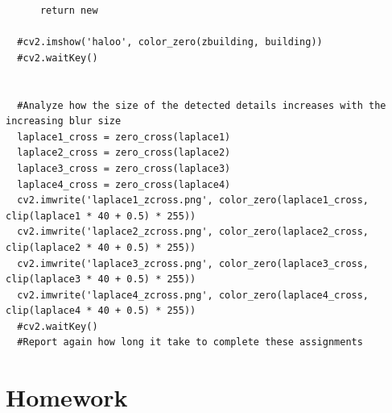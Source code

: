 \documentclass{article}
\begin{document}
\begin{verbatim}
      return new

  #cv2.imshow('haloo', color_zero(zbuilding, building))
  #cv2.waitKey()
      

  #Analyze how the size of the detected details increases with the increasing blur size
  laplace1_cross = zero_cross(laplace1)
  laplace2_cross = zero_cross(laplace2)
  laplace3_cross = zero_cross(laplace3)
  laplace4_cross = zero_cross(laplace4)
  cv2.imwrite('laplace1_zcross.png', color_zero(laplace1_cross, clip(laplace1 * 40 + 0.5) * 255))
  cv2.imwrite('laplace2_zcross.png', color_zero(laplace2_cross, clip(laplace2 * 40 + 0.5) * 255))
  cv2.imwrite('laplace3_zcross.png', color_zero(laplace3_cross, clip(laplace3 * 40 + 0.5) * 255))
  cv2.imwrite('laplace4_zcross.png', color_zero(laplace4_cross, clip(laplace4 * 40 + 0.5) * 255))
  #cv2.waitKey()
  #Report again how long it take to complete these assignments
\end{verbatim}

\section{Homework}
\end{document}
